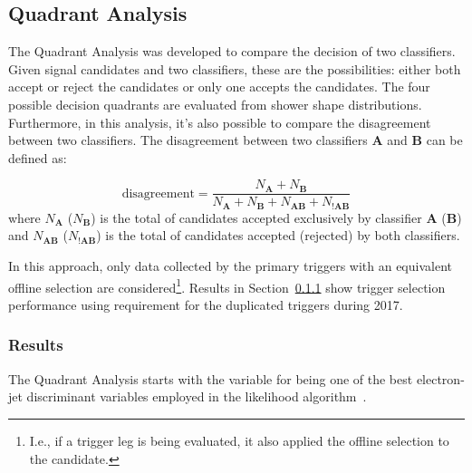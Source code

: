 \subsection{Quadrant Analysis}\label{ssec:quadrant}

The Quadrant Analysis was developed to compare the decision of two classifiers. Given signal candidates and two classifiers, these are the possibilities: either both accept or reject the candidates or only one accepts the candidates. The four possible decision quadrants are evaluated from shower shape distributions. Furthermore, in this analysis, it's also possible to compare the disagreement between two classifiers. The disagreement between two classifiers $\textbf{A}$ and $\textbf{B}$ can be defined as:

\begin{equation}
    \text{disagreement} = \frac{N_{\textbf{A}}+N_{\textbf{B}}}{N_{\textbf{A}}+N_{\textbf{B}}+N_{\textbf{AB}}+N_{!\textbf{AB}}}
    \label{eq:disagreement}
\end{equation}
where $N_{\textbf{A}}$ ($N_{\textbf{B}}$) is the total of candidates accepted exclusively by classifier $\textbf{A}$ ($\textbf{B}$) and $N_{\textbf{AB}}$ ($N_{\textbf{!AB}}$) is the total of candidates accepted (rejected) by both classifiers.

In this approach, only data collected by the primary triggers with an equivalent offline selection are considered\footnote{I.e., if a \tight{} trigger leg is being evaluated, it also applied the \tight{} offline selection to the candidate.}.
Results in Section~\ref{top:quadrant_results} show
trigger selection performance using \tight{} requirement for the duplicated triggers during 2017.

\subsubsection{Results}\label{top:quadrant_results}



The Quadrant Analysis starts with the variable \reta{} for being one of the best electron-jet discriminant variables employed in the likelihood
algorithm~\cite{aaboud2019electron}. 



